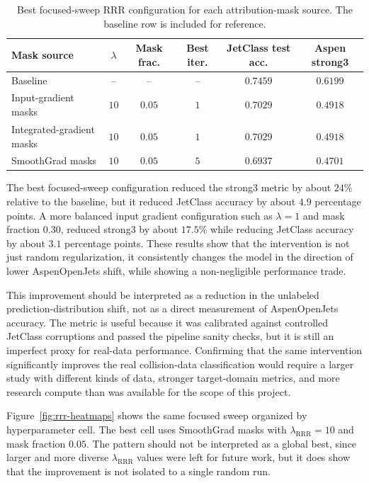 \begin{table}[t]
\centering
\caption{Best focused-sweep RRR configuration for each attribution-mask source. The baseline row is included for reference.}
\label{tab:rrr-best-source}
\begin{tabular}{lccccc}
\toprule
Mask source & $\lambda$ & Mask frac. & Best iter. & JetClass test acc. & Aspen strong3 \\
\midrule
Baseline & -- & -- & -- & $0.7459$ & $0.6199$ \\
Input-gradient masks & $10$ & $0.05$ & $1$ & $0.7029$ & $0.4918$ \\
Integrated-gradient masks & $10$ & $0.05$ & $1$ & $0.7029$ & $0.4918$ \\
SmoothGrad masks & $10$ & $0.05$ & $5$ & $0.6937$ & $0.4701$ \\
\bottomrule
\end{tabular}
\end{table}

The best focused-sweep configuration reduced the strong3 metric by about $24\%$ relative to the baseline, but it reduced JetClass accuracy by about $4.9$ percentage points. A more balanced input gradient configuration such as $\lambda=1$ and mask fraction $0.30$, reduced strong3 by about $17.5\%$ while reducing JetClass accuracy by about $3.1$ percentage points. These results show that the intervention is not just random regularization, it consistently changes the model in the direction of lower AspenOpenJets shift, while showing a non-negligible performance trade.

This improvement should be interpreted as a reduction in the unlabeled prediction-distribution shift, not as a direct measurement of AspenOpenJets accuracy. The metric is useful because it was calibrated against controlled JetClass corruptions and passed the pipeline sanity checks, but it is still an imperfect proxy for real-data performance. Confirming that the same intervention significantly improves the real collision-data classification would require a larger study with different kinds of data, stronger target-domain metrics, and more research compute than was available for the scope of this project.

Figure~\ref{fig:rrr-heatmaps} shows the same focused sweep organized by hyperparameter cell. The best cell uses SmoothGrad masks with $\lambda_{\mathrm{RRR}}=10$ and mask fraction $0.05$. The pattern should not be interpreted as a global best, since larger and more diverse $\lambda_{\mathrm{RRR}}$ values were left for future work, but it does show that the improvement is not isolated to a single random run.


